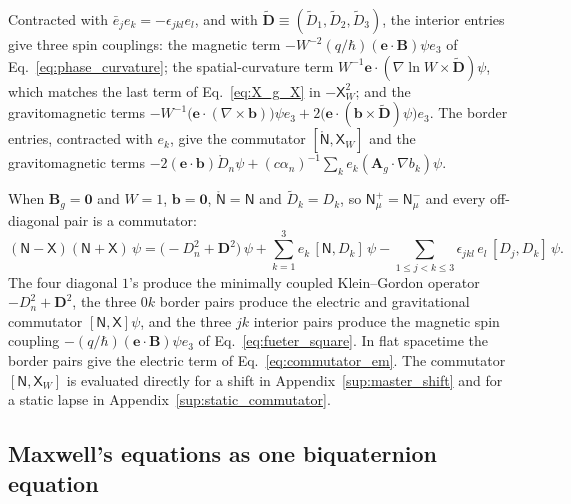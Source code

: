 \documentclass[aps,prd,onecolumn,tightenlines,nofootinbib,notitlepage,11pt,floatfix]{revtex4-2}
\theoremstyle{indentedtheorem}
\begin{document}
Contracted with $\bar{e}_je_k=-\epsilon_{jkl}e_l$, and with $\tilde{\mathbf{D}}\equiv(\tilde{D}_1,\tilde{D}_2,\tilde{D}_3)$, the interior entries give three spin couplings: the magnetic term $-W^{-2}(q/\hbar)(\mathbf{e}\cdot\mathbf{B})\psi e_3$ of Eq.~\eqref{eq:phase_curvature}; the spatial-curvature term $W^{-1}\mathbf{e}\cdot(\nabla\ln W\times\tilde{\mathbf{D}})\psi$, which matches the last term of Eq.~\eqref{eq:X_g_X} in $-\mathsf{X}_W^2$; and the gravitomagnetic terms $-W^{-1}\big(\mathbf{e}\cdot(\nabla\times\mathbf{b})\big)\psi e_3 + 2\big(\mathbf{e}\cdot(\mathbf{b}\times\tilde{\mathbf{D}})\psi\big)e_3$. The border entries, contracted with $e_k$, give the commutator $[\mathring{\mathsf{N}},\mathsf{X}_W]$ and the gravitomagnetic terms $-2(\mathbf{e}\cdot\mathbf{b})\mathring{D}_n\psi + (c\alpha_n)^{-1}\sum_ke_k(\mathbf{A}_g\cdot\nabla b_k)\psi$.

When $\mathbf{B}_g=\mathbf{0}$ and $W=1$, $\mathbf{b}=\mathbf{0}$, $\mathring{\mathsf{N}}=\mathsf{N}$ and $\tilde{D}_k=D_k$, so $\mathsf{N}_\mu^+=\mathsf{N}_\mu^-$ and every off-diagonal pair is a commutator:
\begin{equation}
    (\mathsf{N}-\mathsf{X})(\mathsf{N}+\mathsf{X})\,\psi = \big(-D_n^2 + \mathbf{D}^2\big)\,\psi + \sum_{k=1}^{3} e_k\,[\mathsf{N},D_k]\,\psi - \sum_{1\le j<k\le3} \epsilon_{jkl}\,e_l\,[D_j,D_k]\,\psi .
    \label{eq:pure_table_expansion}
\end{equation}
The four diagonal $1$'s produce the minimally coupled Klein--Gordon operator $-D_n^2+\mathbf{D}^2$, the three $0k$ border pairs produce the electric and gravitational commutator $[\mathsf{N},\mathsf{X}]\psi$, and the three $jk$ interior pairs produce the magnetic spin coupling $-(q/\hbar)(\mathbf{e}\cdot\mathbf{B})\psi e_3$ of Eq.~\eqref{eq:fueter_square}. In flat spacetime the border pairs give the electric term of Eq.~\eqref{eq:commutator_em}. The commutator $[\mathsf{N},\mathsf{X}_W]$ is evaluated directly for a shift in Appendix~\ref{sup:master_shift} and for a static lapse in Appendix~\ref{sup:static_commutator}.

\subsection{Maxwell's equations as one biquaternion equation}
\label{sec:maxwell}
\end{document}
